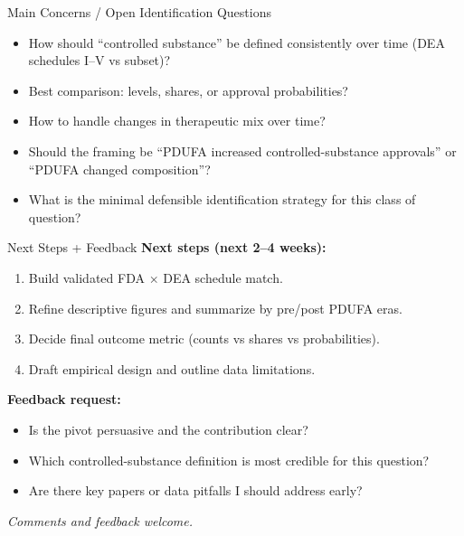 \documentclass[11pt]{beamer}
\begin{document}
\begin{frame}{Main Concerns / Open Identification Questions}
\begin{itemize}
  \item How should ``controlled substance'' be defined consistently over time (DEA schedules I--V vs subset)?
  \item Best comparison: levels, shares, or approval probabilities?
  \item How to handle changes in therapeutic mix over time?
  \item Should the framing be ``PDUFA increased controlled-substance approvals'' or ``PDUFA changed composition''?
  \item What is the minimal defensible identification strategy for this class of question?
\end{itemize}
\end{frame}

\begin{frame}{Next Steps + Feedback}
\textbf{Next steps (next 2--4 weeks):}
\begin{enumerate}
  \item Build validated FDA $\times$ DEA schedule match.
  \item Refine descriptive figures and summarize by pre/post PDUFA eras.
  \item Decide final outcome metric (counts vs shares vs probabilities).
  \item Draft empirical design and outline data limitations.
\end{enumerate}

\vspace{0.75em}
\textbf{Feedback request:}
\begin{itemize}
  \item Is the pivot persuasive and the contribution clear?
  \item Which controlled-substance definition is most credible for this question?
  \item Are there key papers or data pitfalls I should address early?
\end{itemize}

\vspace{0.5em}
\textit{Comments and feedback welcome.}
\end{frame}
\end{document}
